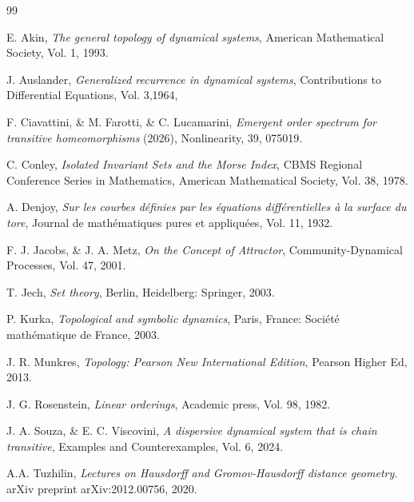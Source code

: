 \documentclass[10pt,a4paper]{article}
\theoremstyle{definition}
\theoremstyle{remark}
\theoremstyle{plain}
\begin{document}
\begin{thebibliography}{99}

E. Akin, \textit{The general topology of dynamical systems},  American Mathematical Society, Vol. 1, 1993.

J. Auslander, \textit{Generalized recurrence in dynamical systems}, Contributions to
Differential Equations, Vol. 3,1964,

F. Ciavattini, \& M. Farotti, \& C. Lucamarini, \textit{ Emergent order spectrum for transitive homeomorphisms} (2026),
Nonlinearity, 39, 075019.

C. Conley,
\textit{Isolated Invariant Sets and the Morse Index},
CBMS Regional Conference Series in Mathematics, American Mathematical Society, Vol. 38, 1978.

A. Denjoy, \textit{Sur les courbes définies par les équations différentielles à la surface du tore}, Journal de mathématiques pures et appliquées, Vol. 11, 1932.

F. J. Jacobs, \& J. A. Metz, \textit{On the Concept of Attractor}, Community-Dynamical Processes, Vol. 47, 2001.

T. Jech, \textit{Set theory}, Berlin, Heidelberg: Springer, 2003.

P. Kurka, \textit{Topological and symbolic dynamics}, Paris, France: Société mathématique de France, 2003.


J. R. Munkres,
\textit{Topology: Pearson New International Edition}, Pearson Higher Ed, 2013.

J. G. Rosenstein, \textit{Linear orderings}, Academic press, Vol. 98, 1982.

J. A. Souza, \& E. C. Viscovini,  \textit{A dispersive dynamical system that is chain transitive}, Examples and Counterexamples, Vol. 6, 2024.

A.A. Tuzhilin, \textit{Lectures on Hausdorff and Gromov-Hausdorff distance geometry.} arXiv preprint arXiv:2012.00756, 2020.


\end{thebibliography}
\end{document}
